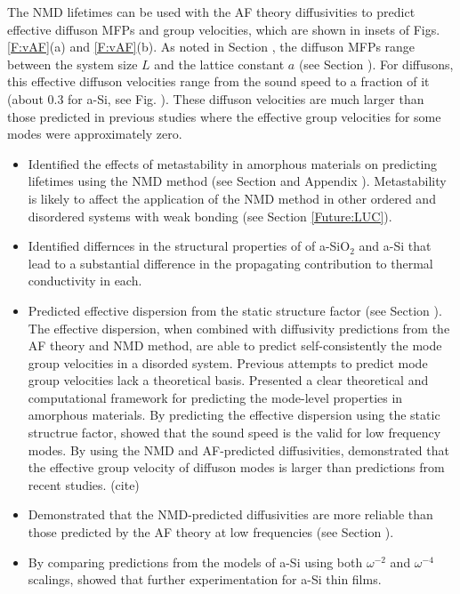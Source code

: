 The NMD lifetimes can be used with the AF theory diffusivities to predict 
effective diffuson MFPs and group velocities, which are shown in insets 
of Figs. \ref{F:vAF}(a) and \ref{F:vAF}(b). As noted in Section , the 
diffuson MFPs range between the system size $L$ and the lattice constant 
$a$ (see Section ). 
For diffusons, this effective diffuson velocities range from the 
sound speed to a fraction of it (about 0.3 for a-Si, see Fig. ). These 
diffuson velocities are much larger than 
those predicted in previous studies where the effective group velocities 
for some modes were approximately zero.\cite{}

\begin{itemize}
\item Identified the effects of metastability in amorphous materials 
on predicting lifetimes using the NMD method 
(see Section and Appendix ). 
Metastability is likely 
to affect the application of the NMD method in other ordered and 
disordered systems with weak bonding (see Section \ref{Future:LUC}). 
\item Identified differnces in the structural properties of 
of a-SiO$_2$ and a-Si that lead to a substantial difference in the 
propagating contribution to thermal conductivity in each. 
\item Predicted effective dispersion from the static structure factor (see 
Section ). The effective dispersion, when combined with diffusivity 
predictions from the AF theory and NMD method, are able to predict 
self-consistently the mode group velocities in a disorded system. 
Previous attempts to predict mode group velocities lack a theoretical basis. 
Presented a clear theoretical and computational framework 
for predicting the mode-level properties in amorphous materials. 
By predicting the effective dispersion using the static structrue 
factor, showed that the sound speed is the valid for 
low frequency modes. By using the NMD and AF-predicted 
diffusivities, demonstrated that the effective group velocity of 
diffuson modes is larger than predictions from recent studies.
(cite) 
\item Demonstrated that the NMD-predicted diffusivities are more 
reliable than those predicted by the AF theory at low frequencies 
(see Section ).
\item By comparing predictions from the models of a-Si using 
both $\omega^{-2}$ and $\omega^{-4}$ scalings, showed that 
further experimentation for a-Si thin films.

\end{itemize}


